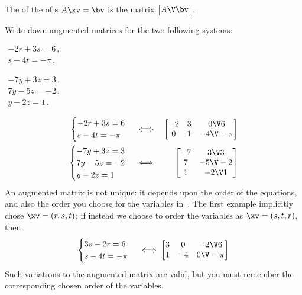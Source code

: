 \begin{definition} \label{def:augmat}
The  of the  of s \(A\xv=\bv\) is the matrix \(\begin{bmatrix} A\V \bv \end{bmatrix}\).
\end{definition}

\begin{example} \label{eg:}
Write down augmented matrices for the two following systems:
\begin{parts}
\item \(\begin{array}{l} -2r+3s=6\,,\\s-4t=-\pi\,, \end{array}\)
\item \(\begin{array}{l}
-7y+3z=3\,,\\7y-5z=-2\,,\\y-2z=1\,.
\end{array}\)
\end{parts}
\begin{solution} 
\begin{eqnarray*}
\begin{cases} -2r+3s=6\\s-4t=-\pi \end{cases}
&\iff&%
\begin{bmatrix} -2&3&0\V6\\ 0&1&-4\V-\pi \end{bmatrix}
\\
\begin{cases}
-7y+3z=3\\7y-5z=-2\\y-2z=1
\end{cases}
&\iff&%
\begin{bmatrix} -7&3\V3\\ 7&-5\V-2\\1&-2\V1 \end{bmatrix}
\end{eqnarray*} 
An augmented matrix is not unique: it depends upon the order of the equations, and also the order you choose for the variables in~\xv.  
The first example implicitly chose \(\xv=(r,s,t)\); if instead we choose to order the variables as \(\xv=(s,t,r)\), then  
\begin{equation*}
\begin{cases} 3s-2r=6\\s-4t=-\pi \end{cases}
\iff%
\begin{bmatrix} 3&0&-2\V6\\ 1&-4&0\V-\pi \end{bmatrix}
\end{equation*} 
Such variations to the augmented matrix are valid, but you must remember the corresponding chosen order of the variables.
\end{solution}
\end{example}

